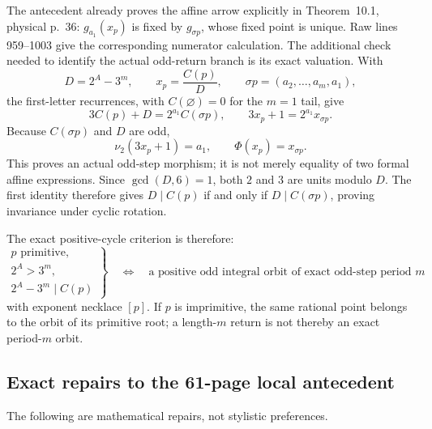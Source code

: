 The antecedent already proves the affine arrow explicitly in
Theorem~10.1, physical p.~36: $g_{a_1}(x_p)$ is fixed by $g_{\sigma p}$,
whose fixed point is unique.  Raw lines 959--1003 give the corresponding
numerator calculation.  The additional check needed to identify the actual
odd-return branch is its exact valuation.  With
\[
 D=2^A-3^m,
 \qquad x_p=\frac{C(p)}D,
 \qquad \sigma p=(a_2,\ldots,a_m,a_1),
\]
the first-letter recurrences, with $C(\varnothing)=0$ for the $m=1$
tail, give
\[
 3C(p)+D=2^{a_1}C(\sigma p),
 \qquad 3x_p+1=2^{a_1}x_{\sigma p}.
\]
Because $C(\sigma p)$ and $D$ are odd,
\[
 \nu_2(3x_p+1)=a_1,
 \qquad \Phi(x_p)=x_{\sigma p}.
\]
This proves an actual odd-step morphism; it is not merely equality of two
formal affine expressions.  Since $\gcd(D,6)=1$, both $2$ and $3$ are
units modulo $D$.  The first identity therefore gives
$D\mid C(p)$ if and only if $D\mid C(\sigma p)$, proving invariance
under cyclic rotation.

The exact positive-cycle criterion is therefore:
\[
 \left.
 \begin{array}{c}
 p\text{ primitive},\\
 2^A>3^m,\\
 2^A-3^m\mid C(p)
 \end{array}
 \right\}
 \quad\Longleftrightarrow\quad
 \text{a positive odd integral orbit of exact odd-step period }m
\]
with exponent necklace $[p]$.  If $p$ is imprimitive, the same rational point
belongs to the orbit of its primitive root; a length-$m$ return is not thereby
an exact period-$m$ orbit.

\subsection{Exact repairs to the 61-page local antecedent}

The following are mathematical repairs, not stylistic preferences.

